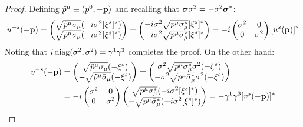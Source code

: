 \begin{proofbox}
  \begin{proof}
    Defining $ \tilde{p}^\mu \equiv (p^0, -\mathbf{p}) $ and recalling that $ \boldsymbol{\sigma} \sigma^2 = - \sigma^2 \boldsymbol{\sigma}^* $:
    \begin{equation*}
      u^{-s}(-\mathbf{p}) =
      \begin{pmatrix}
        \sqrt{\tilde{p}^\mu \sigma_\mu} (-i \sigma^2 [\xi^s]^*) \\
        \sqrt{\tilde{p}^\mu \bar{\sigma}_\mu} (-i \sigma^2 [\xi^s]^*)
      \end{pmatrix}
      =
      \begin{pmatrix}
        -i \sigma^2 \sqrt{p^\mu \sigma_\mu^*} [\xi^s]^* \\
        -i \sigma^2 \sqrt{p^\mu \bar{\sigma}_\mu^*} [\xi^s]^*
      \end{pmatrix}
      = -i \begin{pmatrix} \sigma^2 & 0 \\ 0 & \sigma^2 \end{pmatrix} [u^s(\mathbf{p})]^*
    \end{equation*}
    Noting that $ i \operatorname{diag}(\sigma^2,\sigma^2) = \gamma^1 \gamma^3 $ completes the proof. On the other hand:
    \begin{equation*}
      \begin{split}
        v^{-s}(-\mathbf{p})
        &=
        \begin{pmatrix}
          \sqrt{\tilde{p}^\mu \sigma_\mu} (-\xi^s) \\
          - \sqrt{\tilde{p}^\mu \bar{\sigma}_\mu} (-\xi^s)
        \end{pmatrix}
        = 
        \begin{pmatrix}
          \sigma^2 \sqrt{p^\mu \sigma_\mu^*} \sigma^2 (-\xi^s) \\
          - \sigma^2 \sqrt{p^\mu \bar{\sigma}_\mu^*} \sigma^2 (-\xi^s)
        \end{pmatrix}\\
        &= -i \begin{pmatrix} \sigma^2 & 0 \\ 0 & \sigma^2 \end{pmatrix}
        \begin{pmatrix}
          \sqrt{p^\mu \sigma_\mu^*} (-i \sigma^2 [\xi^s]^*) \\
          - \sqrt{p^\mu \bar{\sigma}_\mu^*} (-i \sigma^2 [\xi^s]^*)
        \end{pmatrix}
        = - \gamma^1 \gamma^3 [v^s(-\mathbf{p})]^*
      \end{split}
    \end{equation*}
  \end{proof}
\end{proofbox}

